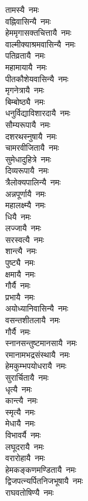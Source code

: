 \begin{multicols}{2}
\begin{flushleft}
तामस्यै~नमः\\
वह्निवासिन्यै~नमः\\
हेममृगासक्तचित्तायै~नमः\\
वाल्मीक्याश्रमवासिन्यै~नमः\\
पतिव्रतायै~नमः\\
महामायायै~नमः\\
पीतकौशेयवासिन्यै~नमः\\
मृगनेत्रायै~नमः\\
बिम्बोष्ठ्यै~नमः\hfill{}\\
धनुर्विद्याविशारदायै~नमः\\
सौम्यरूपायै~नमः\\
दशरथस्नुषायै~नमः\\
चामरवीजितायै~नमः\\
सुमेधादुहित्रे~नमः\\
दिव्यरूपायै~नमः\\
त्रैलोक्यपालिन्यै~नमः\\
अन्नपूर्णायै~नमः\\
महालक्ष्म्यै~नमः\\
धियै~नमः\hfill{}\\
लज्जायै~नमः\\
सरस्वत्यै~नमः\\
शान्त्यै~नमः\\
पुष्ट्यै~नमः\\
क्षमायै~नमः\\
गौर्यै~नमः\\
प्रभायै~नमः\\
अयोध्यानिवासिन्यै~नमः\\
वसन्तशीतलायै~नमः\\
गौर्यै~नमः\hfill{}\\
स्नानसन्तुष्टमानसायै~नमः\\
रमानामभद्रसंस्थायै~नमः\\
हेमकुम्भपयोधरायै~नमः\\
सुरार्चितायै~नमः\\
धृत्यै~नमः\\
कान्त्यै~नमः\\
स्मृत्यै~नमः\\
मेधायै~नमः\\
विभावर्यै~नमः\\
लघूदरायै~नमः\hfill{}\\
वरारोहायै~नमः\\
हेमकङ्कणमण्डितायै~नमः\\
द्विजपत्न्यर्पितनिजभूषायै~नमः\\
राघवतोषिण्यै~नमः\\

\end{flushleft}
\end{multicols}
